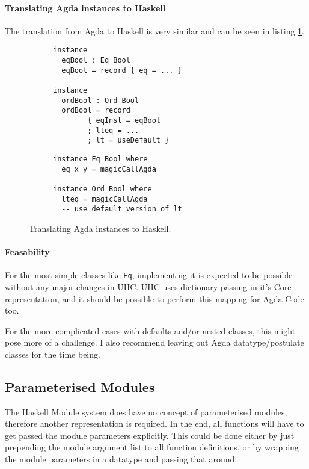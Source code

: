 \documentclass[12pt, a4paper, twoside]{report}
\begin{document}
\paragraph{Translating Agda instances to Haskell}
The translation from Agda to Haskell is very similar and can be seen in listing \ref{lst:inst-agda-hs}.
\begin{figure}
\begin{subfigure}[b]{0.5\textwidth}
\begin{lstlisting}
instance
  eqBool : Eq Bool
  eqBool = record { eq = ... }

instance
  ordBool : Ord Bool
  ordBool = record
        { eqInst = eqBool
        ; lteq = ...
        ; lt = useDefault }
\end{lstlisting}
\end{subfigure}
\hspace{10pt}
\begin{subfigure}[b]{0.5\textwidth}
\begin{lstlisting}
instance Eq Bool where
  eq x y = magicCallAgda

instance Ord Bool where
  lteq = magicCallAgda
  -- use default version of lt
\end{lstlisting}
\end{subfigure}
\caption{Translating Agda instances to Haskell.}
\label{lst:inst-agda-hs}
\end{figure}


\paragraph{Feasability}
For the most simple classes like \texttt{Eq}, implementing it is expected to be
possible without any major changes in UHC. UHC uses dictionary-passing in it's Core representation,
and it should be possible to perform this mapping for Agda Code too.

For the more complicated cases with defaults and/or nested classes, this might pose more of a challenge.
I also recommend leaving out Agda datatype/postulate classes for the time being.

\subsection{Parameterised Modules}
\label{sec:ffi:par-mod}
The Haskell Module system does have no concept of parameterised modules, therefore another representation is required. In the end,
all functions will have to get passed the module parameters explicitly. This could be done either by just prepending the module
argument list to all function definitions, or by wrapping the module parameters in a datatype and passing that around.
\end{document}

